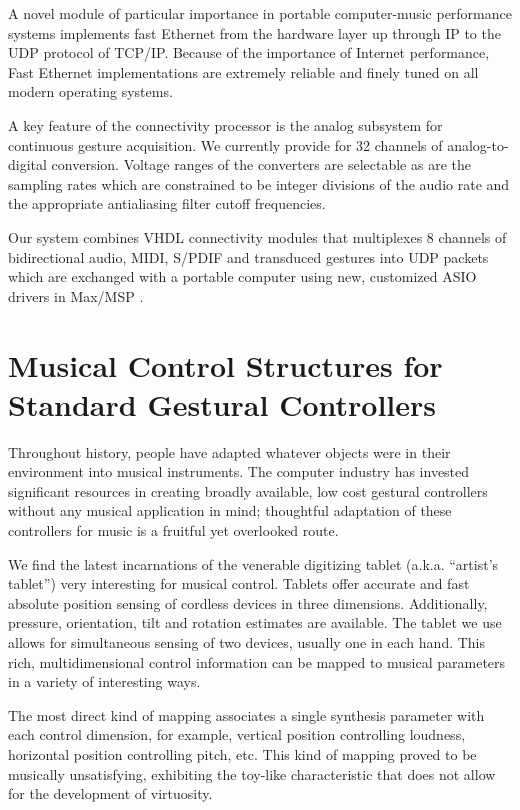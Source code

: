 A novel module of particular importance in portable computer-music performance systems implements fast Ethernet from the hardware layer up through IP to the UDP protocol of TCP/IP. Because of the importance of Internet performance, Fast Ethernet implementations are extremely reliable and finely tuned on all modern operating systems.

A key feature of the connectivity processor is the analog subsystem for continuous gesture acquisition. We currently provide for 32 channels of analog-to-digital conversion. Voltage ranges of the converters are selectable as are the sampling rates which are constrained to be integer divisions of the audio rate and the appropriate antialiasing filter cutoff frequencies.

Our system combines VHDL connectivity modules that multiplexes 8 channels of bidirectional audio, MIDI, S/PDIF and transduced gestures into UDP packets which are exchanged with a portable computer using new, customized ASIO drivers in Max/MSP \cite{Avizienis:2000}.


\section{Musical Control Structures for Standard Gestural Controllers}

Throughout history, people have adapted whatever objects were in their environment into musical instruments. The computer industry has invested significant resources in creating broadly available, low cost gestural controllers without any musical application in mind; thoughtful adaptation of these controllers for music is a fruitful yet overlooked route.

We find the latest incarnations of the venerable digitizing tablet (a.k.a. ``artist's tablet'') very interesting for musical control. Tablets offer accurate and fast absolute position sensing of cordless devices in three dimensions. Additionally, pressure, orientation, tilt and rotation estimates are available. The tablet we use allows for simultaneous sensing of two devices, usually one in each hand. This rich, multidimensional control information can be mapped to musical parameters in a variety of interesting ways.

The most direct kind of mapping associates a single synthesis parameter with each control dimension, for example, vertical position controlling loudness, horizontal position controlling pitch, etc. This kind of mapping proved to be musically unsatisfying, exhibiting the toy-like characteristic that does not allow for the development of virtuosity.

